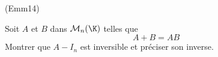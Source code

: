 \begin{tiny}(Emm14)\end{tiny} Soit $A$ et $B$ dans $\mathcal{M}_n(\K)$ telles que
\begin{displaymath}
 A+B = AB
\end{displaymath}
 Montrer que $A-I_n$ est inversible et préciser son inverse.